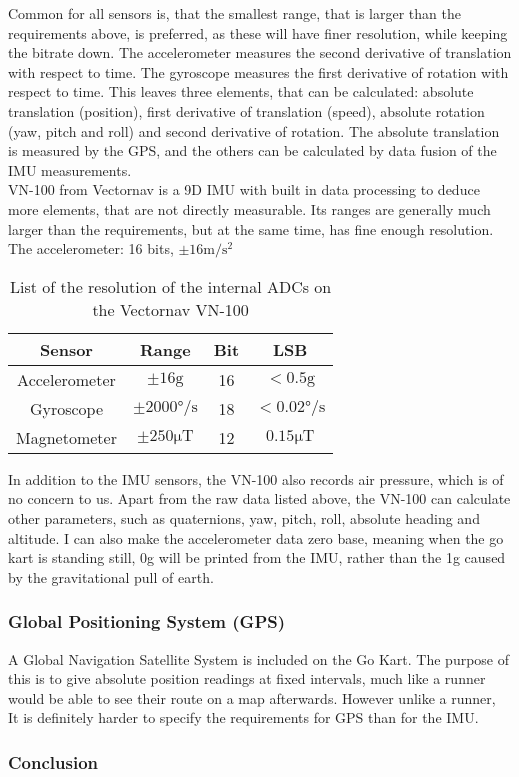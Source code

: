 Common for all sensors is, that the smallest range, that is larger than the requirements above, is preferred, as these will have finer resolution, while keeping the bitrate down.
The accelerometer measures the second derivative of translation with respect to time. 
The gyroscope measures the first derivative of rotation with respect to time.
This leaves three elements, that can be calculated: absolute translation (position), first derivative of translation (speed), absolute rotation (yaw, pitch and roll) and second derivative of rotation.
The absolute translation is measured by the GPS, and the others can be calculated by data fusion of the IMU measurements.\\

VN-100 from Vectornav is a 9D IMU with built in data processing to deduce more elements, that are not directly measurable.
Its ranges are generally much larger than the requirements, but at the same time, has fine enough resolution.
The accelerometer: 16 bits,  $\pm 16 \si{\meter \per \second \squared}$

\begin{table}
	\centering
	\begin{tabular}{ c | c c c}
		{\textbf{Sensor}} & {\textbf{Range}} & {\textbf{Bit}} & {\textbf{LSB}}\\
		\hline
		{Accelerometer}	& { $\pm 16 \mathrm{g}$}					& {16}	& {$< 0.5 \mathrm{g}$}\\
		{Gyroscope}		& { $\pm 2000\si{\degree \per \second}$ }	& {18}	& {$<0.02 \si{\degree \per \second}$}\\
		{Magnetometer}	& { $\pm 250 \si{\micro \tesla}$}			& {12}	& {$0.15 \si{\micro \tesla}$}
	\end{tabular}
	\caption{List of the resolution of the internal ADCs on the Vectornav VN-100}
	\label{tab:vectornav_measurement_resolution}
\end{table}

In addition to the IMU sensors, the VN-100 also records air pressure, which is of no concern to us.
Apart from the raw data listed above, the VN-100 can calculate other parameters, such as quaternions, yaw, pitch, roll, absolute heading and altitude.
I can also make the accelerometer data zero base, meaning when the go kart is standing still, 0g will be printed from the IMU, rather than the 1g caused by the gravitational pull of earth. 

\subsubsection*{Global Positioning System (GPS)}
A Global Navigation Satellite System is included on the Go Kart. 
The purpose of this is to give absolute position readings at fixed intervals, much like a runner would be able to see their route on a map afterwards.
However unlike a runner, \\

It is definitely harder to specify the requirements for GPS than for the IMU. 


\subsubsection*{Conclusion}
